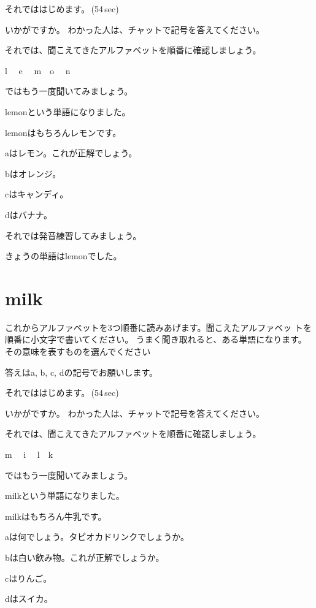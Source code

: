 \documentclass[12pt]{jlreq}
\begin{document}
それでははじめます。\faVolumeUp\,(54\,sec)

いかがですか。
わかった人は、チャットで記号を答えてください。

それでは、聞こえてきたアルファベットを順番に確認しましょう。{\large \ComputerMouse}

l\,\,
{\large \ComputerMouse}\,\,
e\,\,
{\large \ComputerMouse}\,\,
m
{\large \ComputerMouse}\,\,
o\,\,
{\large \ComputerMouse}\,\,
n

ではもう一度聞いてみましょう。

lemonという単語になりました。

lemonはもちろんレモンです。

aはレモン。これが正解でしょう。

bはオレンジ。

cはキャンディ。

dはバナナ。


それでは発音練習してみましょう。

きょうの単語はlemonでした。
\newpage
\section{milk}

これからアルファベットを3つ順番に読みあげます。聞こえたアルファベッ
トを順番に小文字で書いてください。
うまく聞き取れると、ある単語になります。
その意味を表すものを選んでください

答えはa, b, c, dの記号でお願いします。

それでははじめます。\faVolumeUp\,(54\,sec)

いかがですか。
わかった人は、チャットで記号を答えてください。

それでは、聞こえてきたアルファベットを順番に確認しましょう。{\large \ComputerMouse}

m\,\,
{\large \ComputerMouse}\,\,
i\,\,
{\large \ComputerMouse}\,\,
l
{\large \ComputerMouse}\,\,
k\,\,

ではもう一度聞いてみましょう。

milkという単語になりました。

milkはもちろん牛乳です。

aは何でしょう。タピオカドリンクでしょうか。

bは白い飲み物。これが正解でしょうか。

cはりんご。

dはスイカ。
\end{document}
